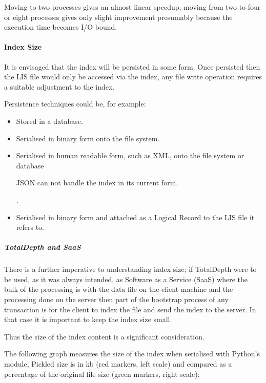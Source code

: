 \documentclass[letterpaper,10pt,english]{sphinxmanual}
\begin{document}
Moving to two processes gives an almost linear speedup, moving from two to four or eight processes gives only slight improvement presumably because the execution time becomes I/O bound.


\paragraph{Index Size}
\label{\detokenize{tech/LIS_indexing:index-size}}
It is envisaged that the index will be persisted in some form. Once persisted then the LIS file would only be accessed via the index, any file write operation requires a suitable adjustment to the index.

Persistence techniques could be, for example:
\begin{itemize}
\item {} 
Stored in a database.

\item {} 
Serialised in binary form onto the file system.

\item {} 
Serialised in human readable form, such as XML, onto the file system or database %
\begin{footnote}[3]\sphinxAtStartFootnote
JSON can not handle the index in its current form.
%
\end{footnote}.

\item {} 
Serialised in binary form and attached as a Logical Record to the LIS file it refers to.

\end{itemize}


\subparagraph{TotalDepth and SaaS}
\label{\detokenize{tech/LIS_indexing:totaldepth-and-saas}}
There is a further imperative to understanding index size; if TotalDepth were to be used, as it was always intended, as Software as a Service (SaaS) where the bulk of the processing is with the data file on the client machine and the processing done on the server then part of the bootstrap process of any transaction is for the client to index the file and send the index to the server. In that case it is important to keep the index size small.

Thus the size of the index content is a significant consideration.

The following graph measures the size of the index when serialised with Python’s  module, Pickled size is in kb (red markers, left scale) and compared as a percentage of the original file size (green markers, right scale):
\end{document}

